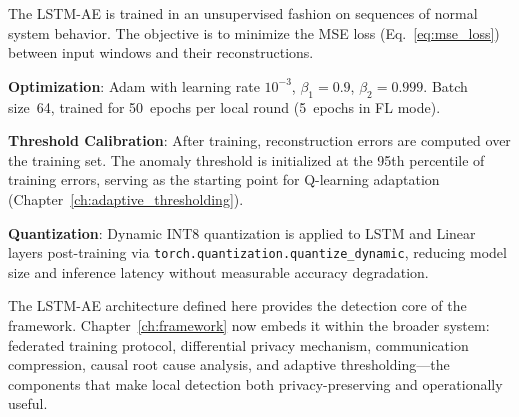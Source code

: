 The LSTM-AE is trained in an unsupervised fashion on sequences of normal
system behavior. The objective is to minimize the MSE loss
(Eq.~\ref{eq:mse_loss}) between input windows and their reconstructions.

\textbf{Optimization}: Adam \cite{kingma2015adam} with learning rate
$10^{-3}$, $\beta_1 = 0.9$, $\beta_2 = 0.999$. Batch size~64, trained
for 50~epochs per local round (5~epochs in FL mode).

\textbf{Threshold Calibration}: After training, reconstruction errors
are computed over the training set. The anomaly threshold is initialized
at the 95th percentile of training errors, serving as the starting point
for Q-learning adaptation (Chapter~\ref{ch:adaptive_thresholding}).

\textbf{Quantization}: Dynamic INT8 quantization is applied to LSTM and
Linear layers post-training via \texttt{torch.quantization.quantize\_dynamic},
reducing model size and inference latency without measurable accuracy
degradation.

The LSTM-AE architecture defined here provides the detection core of the
framework. Chapter~\ref{ch:framework} now embeds it within the broader
system: federated training protocol, differential privacy mechanism,
communication compression, causal root cause analysis, and adaptive
thresholding---the components that make local detection both
privacy-preserving and operationally useful.
